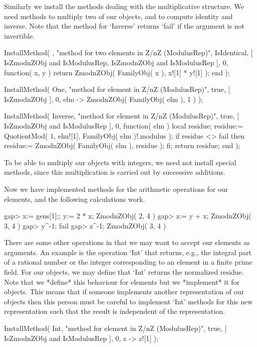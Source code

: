 Similarly we install the methods dealing with the multiplicative
structure.
We need methods to multiply two of our objects,
and to compute identity and inverse.
Note that the method for `Inverse' returns `fail' if the argument
is not invertible.

\beginexample
    InstallMethod( \*,
        "method for two elements in Z/nZ (ModulusRep)",
        IsIdentical,
        [ IsZmodnZObj and IsModulusRep, IsZmodnZObj and IsModulusRep ],
        0,
        function( x, y )
        return ZmodnZObj( FamilyObj( x ), x![1] * y![1] );
        end );

    InstallMethod( One,
        "method for element in Z/nZ (ModulusRep)",
        true,
        [ IsZmodnZObj ], 0,
        elm -> ZmodnZObj( FamilyObj( elm ), 1 ) );

    InstallMethod( Inverse,
        "method for element in Z/nZ (ModulusRep)",
        true,
        [ IsZmodnZObj and IsModulusRep ], 0,
        function( elm )
        local residue;
        residue:= QuotientMod( 1, elm![1], FamilyObj( elm )!.modulus );
        if residue <> fail then
          residue:= ZmodnZObj( FamilyObj( elm ), residue );
        fi;
        return residue;
        end );
\endexample

To be able to multiply our objects with integers,
we need not install special methods,
since this multiplication is carried out by successive additions.

Now we have implemented methods for the arithmetic operations for our
elements, and the following calculations work.

\beginexample
    gap> x:= gens[1];; y:= 2 * x;
    ZmodnZObj( 2, 4 )
    gap> z:= y + x;
    ZmodnZObj( 3, 4 )
    gap> y^-1;
    fail
    gap> z^-1;
    ZmodnZObj( 3, 4 )
\endexample

There are some other operations in {\GAP} that we may want to accept
our elements as arguments.
An example is the operation `Int' that returns, e.g.,
the integral part of a rational number or the integer corresponding to
an element in a finite prime field.
For our objects, we may define that `Int' returns the normalized residue.
Note that we *define* this behaviour for elements
but we *implement* it for objects.
This means that if someone implements another representation of our
objects then this person must be careful to implement `Int' methods for
this new representation such that the result is independent of the
representation.

\beginexample
    InstallMethod( Int,
        "method for element in Z/nZ (ModulusRep)",
        true,
        [ IsZmodnZObj and IsModulusRep ], 0,
        z -> z![1] );
\endexample

